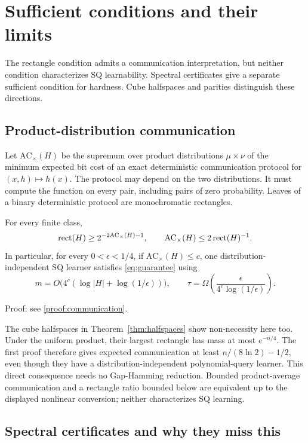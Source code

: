 \section{Sufficient conditions and their limits}\label{sec:characterizations}
The rectangle condition admits a communication interpretation, but neither condition characterizes SQ learnability. Spectral certificates give a separate sufficient condition for hardness. Cube halfspaces and parities distinguish these directions.
\subsection{Product-distribution communication}\label{sec:communication}
Let $\mathrm{AC}_{\times}(H)$ be the supremum over product distributions $\mu\times\nu$ of the minimum expected bit cost of an exact deterministic communication protocol for $(x,h)\mapsto h(x)$. The protocol may depend on the two distributions. It must compute the function on every pair, including pairs of zero probability. Leaves of a binary deterministic protocol are monochromatic rectangles.


\begin{theorem}\label{thm:communication}
For every finite class,
\[
 \operatorname{rect}(H)\ge2^{-2\mathrm{AC}_{\times}(H)-1},
 \qquad
 \mathrm{AC}_{\times}(H)\le2\operatorname{rect}(H)^{-1}.
\]
In particular, for every $0<\epsilon<1/4$, if $\mathrm{AC}_{\times}(H)\le c$, one distribution-independent SQ learner satisfies \eqref{eq:guarantee} using
\[
 m=O\bigl(4^c(\log|H|+\log(1/\epsilon))\bigr),\qquad
 \tau=\Omega\!\left(\frac{\epsilon}{4^c\log(1/\epsilon)}\right).
\]
\end{theorem}

\noindent Proof: see \cref{proof:communication}.\par


The cube halfspaces in Theorem~\ref{thm:halfspaces} show non-necessity here too. Under the uniform product, their largest rectangle has mass at most $e^{-n/4}$. The first proof therefore gives expected communication at least $n/(8\ln2)-1/2$, even though they have a distribution-independent polynomial-query learner. This direct consequence needs no Gap-Hamming reduction. Bounded product-average communication and a rectangle ratio bounded below are equivalent up to the displayed nonlinear conversion; neither characterizes SQ learning.

\subsection{Spectral certificates and why they miss this}\label{sec:retained}

